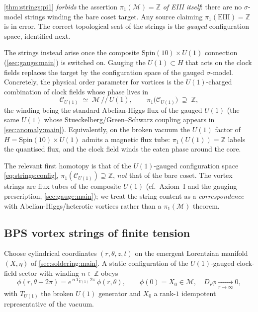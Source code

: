 \begin{remark}
\label{rem:strings:guard}
\autoref{thm:strings:pi1} \emph{forbids} the assertion
$\pi_{1}(\mathcal{M})=\mathbb{Z}$ \emph{of EIII itself}: there are no
$\sigma$-model strings winding the bare coset target. Any source claiming
$\pi_{1}(\mathrm{EIII})=\mathbb{Z}$ is in error. The correct topological
seat of the strings is the \emph{gauged} configuration space, identified
next.
\end{remark}

The strings instead arise once the composite $\mathrm{Spin}(10)\times
U(1)$ connection (\autoref{sec:gauge:main}) is switched on. Gauging the
$U(1)\subset H$ that acts on the clock fields replaces the target by the
configuration space of the gauged $\sigma$-model. Concretely, the
physical order parameter for vortices is the $U(1)$-charged combination
of clock fields whose phase lives in
\[
   \mathcal{C}_{U(1)} \;\simeq\; \mathcal{M}\,/\!/\,U(1),
   \qquad
   \pi_{1}\bigl(\mathcal{C}_{U(1)}\bigr)\;\supseteq\;\mathbb{Z},
   \label{eq:strings:config}
\]
the winding being the standard Abelian-Higgs flux of the gauged $U(1)$
(the same $U(1)$ whose Stueckelberg/Green--Schwarz coupling appears in
\autoref{sec:anomaly:main}). Equivalently, on the broken vacuum the
$U(1)$ factor of $H=\mathrm{Spin}(10)\times U(1)$ admits a magnetic flux
tube: $\pi_{1}(U(1))=\mathbb{Z}$ labels the quantised flux, and the clock
field winds the eaten phase around the core.

\begin{postulate}
\label{post:strings:sector}
The relevant first homotopy is that of the $U(1)$-gauged configuration
space \eqref{eq:strings:config}, $\pi_{1}(\mathcal{C}_{U(1)})\supseteq
\mathbb{Z}$, \emph{not} that of the bare coset. The vortex strings are
flux tubes of the composite $U(1)$ (cf.\ Axiom~I and the gauging
prescription, \autoref{sec:gauge:main}); we treat the string content as a
\emph{correspondence} with Abelian-Higgs/heterotic vortices rather than a
$\pi_{1}(\mathcal{M})$ theorem.
\end{postulate}

\subsection{BPS vortex strings of finite tension}
\label{sec:strings:bps}

Choose cylindrical coordinates $(r,\theta,z,t)$ on the emergent
Lorentzian manifold $(X,\eta)$ of \autoref{sec:soldering:main}. A static
configuration of the $U(1)$-gauged clock-field sector with winding
$n\in\mathbb{Z}$ obeys
\begin{equation}
  \phi(r,\theta+2\pi)=e^{\,n\,T_{U(1)}\,2\pi}\,\phi(r,\theta),
  \qquad
  \phi(0)=X_{0}\in\mathcal{M},\quad
  D_{r}\phi\xrightarrow[r\to\infty]{}0,
  \label{eq:strings:ansatz}
\end{equation}
with $T_{U(1)}$ the broken $U(1)$ generator and $X_{0}$ a rank-$1$
idempotent representative of the vacuum.

